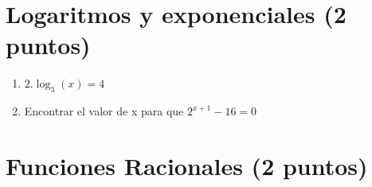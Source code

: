\documentclass[a4paper,11pt,spanish,sans]{exam}
\begin{document}
\section{Logaritmos y exponenciales (2 puntos)}
\begin{enumerate}
	
	\item $2.\log_3(x)=4$
	
	\item Encontrar el valor de x para que $2^{x+1}-16=0$
	
\end{enumerate}


\section{Funciones Racionales (2 puntos)}
\end{document}
